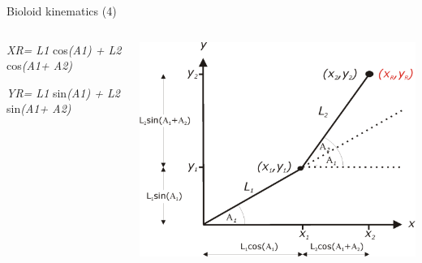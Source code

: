 \documentclass[compress]{beamer}
\begin{document}
\begin{frame}{Bioloid kinematics (4)}

    \begin{columns}
        \begin{column}{0.5\linewidth}

    \emph{XR= L1} cos\emph{(A1) + L2} cos\emph{(A1+ A2)}


    \emph{YR= L1} sin\emph{(A1) + L2} sin\emph{(A1+ A2)}
        \end{column}
        \begin{column}{0.5\linewidth}

            \begin{center}
                \includegraphics[width=0.8\linewidth]{image33}
            \end{center}
        \end{column}
    \end{columns}


\end{frame}
\end{document}
